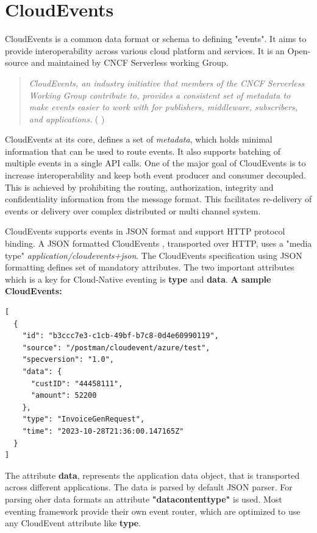 \documentclass{article}
\begin{document}
\section{CloudEvents}
\begin{flushleft}
CloudEvents is a common data format or schema to defining "events". It aims to provide interoperability across various cloud platform and services. It is an Open-source and maintained by \gls{CNCF} Serverless working Group.
\par
\begin{quote}
    \textit{CloudEvents, an industry initiative that members of the \gls{CNCF} Serverless Working Group contribute to, provides a consistent set of metadata to make events easier to work with for publishers, middleware, subscribers, and applications.}
    \newline ( \cite{cncf_to_host_cloudevents_in_the_sandbox_2023} )
\end{quote}
\par
CloudEvents at its core, defines a set of \textit{metadata}, which holds minimal information that can be used to route events. It also supports batching of multiple events in a single API calls. One of the major goal of CloudEvents is to increase interoperability and keep both event producer and consumer decoupled. This is achieved by prohibiting the routing, authorization, integrity and confidentiality information from the message format. This facilitates re-delivery of events or delivery over complex distributed or multi channel system.
\par
CloudEvents supports events in \gls{JSON} format and support \gls{HTTP} protocol binding. A \gls{JSON} formatted CloudEvents , transported over \gls{HTTP}, uses a "media type" \textit{application/cloudevents+json}. The CloudEvents specification using \gls{JSON} formatting defines set of mandatory attributes. The two important attributes which is a key for Cloud-Native eventing is \textbf{type} and \textbf{data}.
\newline
\textbf{A sample CloudEvents:} 
\begin{verbatim}
[
  {
    "id": "b3ccc7e3-c1cb-49bf-b7c8-0d4e60990119",
    "source": "/postman/cloudevent/azure/test",
    "specversion": "1.0",
    "data": {
      "custID": "44458111",
      "amount": 52200
    },
    "type": "InvoiceGenRequest",
    "time": "2023-10-28T21:36:00.147165Z"
  }
]
\end{verbatim}
The attribute \textbf{data}, represents the application data object, that is transported across different applications. The data is parsed by default \gls{JSON} parser. For parsing oher data formats an attribute \textbf{"datacontenttype"} is used. Most eventing framework provide their own event router, which are optimized to use any CloudEvent attribute like \textbf{type}.

\end{flushleft}
\end{document}
